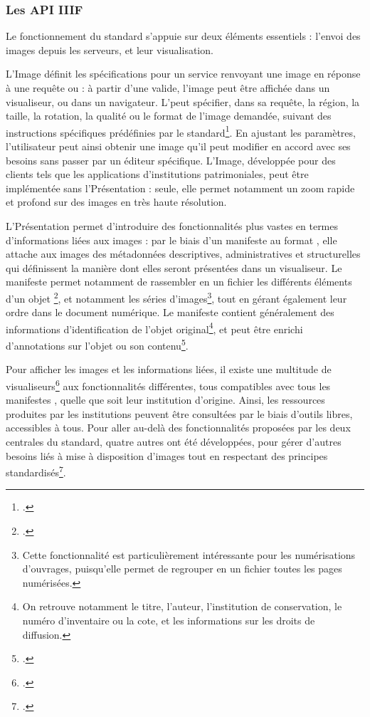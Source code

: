     \subsubsection{Les API IIIF}
	Le fonctionnement du standard \iiif s'appuie sur deux éléments essentiels : l'envoi des images depuis les serveurs, et leur visualisation. 
	
	L'\api Image définit les spécifications pour un service renvoyant une image en réponse à une requête \http ou \https : à partir d'une \uri valide, l'image peut être affichée dans un visualiseur, ou dans un navigateur. L'\uri peut spécifier, dans sa requête, la région, la taille, la rotation, la qualité ou le format de l'image demandée, suivant des instructions spécifiques prédéfinies par le standard\footcite{ImageAPI}. En ajustant les paramètres, l'utilisateur peut ainsi obtenir une image qu'il peut modifier en accord avec ses besoins sans passer par un éditeur spécifique. L'\api Image, développée pour des clients tels que les applications d'institutions patrimoniales, peut être implémentée sans l'\api Présentation : seule, elle permet notamment un zoom rapide et profond sur des images en très haute résolution.
	
	L'\api Présentation permet d'introduire des fonctionnalités plus vastes en termes d'informations liées aux images : par le biais d'un manifeste au format \json, elle attache aux images des métadonnées descriptives, administratives et structurelles qui définissent la manière dont elles seront présentées dans un visualiseur. Le manifeste permet notamment de rassembler en un fichier les différents éléments d'un objet \iiif\footcite{HowItWorks}, et notamment les séries d'images\footnote{Cette fonctionnalité est particulièrement intéressante pour les numérisations d'ouvrages, puisqu'elle permet de regrouper en un fichier toutes les pages numérisées.}, tout en gérant également leur ordre dans le document numérique. Le manifeste contient généralement des informations d'identification de l'objet original\footnote{On retrouve notamment le titre, l'auteur, l'institution de conservation, le numéro d'inventaire ou la cote, et les informations sur les droits de diffusion.}, et peut être enrichi d'annotations sur l'objet ou son contenu\footcite{PresentationAPI}.
	
	Pour afficher les images et les informations liées, il existe une multitude de visualiseurs\footcite{IIIFViewers} aux fonctionnalités différentes, tous compatibles avec tous les manifestes \iiif, quelle que soit leur institution d'origine. Ainsi, les ressources produites par les institutions peuvent être consultées par le biais d'outils libres, accessibles à tous. Pour aller au-delà des fonctionnalités proposées par les deux \api centrales du standard, quatre autres \api ont été développées, pour gérer d'autres besoins liés à mise à disposition d'images tout en respectant des principes standardisés\footcite{HowItWorks}.
    
